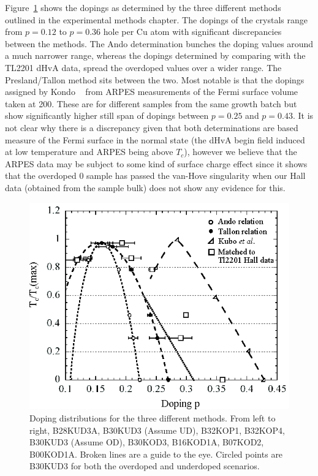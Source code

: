 Figure~\ref{Fig:ResH:Dopings} shows the dopings as determined by the three different methods outlined in the experimental methods chapter. The dopings of the crystals range from $p=0.12$ to $p=0.36$ hole per Cu atom with significant discrepancies between the methods. The Ando determination bunches the doping values around a much narrower range, whereas the dopings determined by comparing with the \ac{TL2201} \ac{dHvA} data, spread the overdoped values over a wider range. The Presland/Tallon method sits between the two. Most notable is that the dopings assigned by Kondo \etal~\cite{Kondo2004} from \ac{ARPES} measurements of the Fermi surface volume taken at \unit{200}{\kelvin}. These are for different samples from the same growth batch but show significantly higher still span of dopings between $p=0.25$ and $p=0.43$. It is not clear why there is a discrepancy given that both determinations are based measure of the Fermi surface in the normal state (the \ac{dHvA} begin field induced at low temperature and \ac{ARPES} being above $T_c$), however we believe that the \ac{ARPES} data may be subject to some kind of surface charge effect since it shows that the overdoped \unit{0}{\kelvin} sample has passed the van-Hove singularity when our Hall data (obtained from the sample bulk) does not show any evidence for this.

\begin{figure}[htbp]
    \begin{center}
        \includegraphics[scale=1.1]{Chapter-HallBSCO/Figures/Dopings/Dopings}
        \caption{Doping distributions for the three different methods. From left to right, B28KUD3A, B30KUD3 (Assume UD), B32KOP1, B32KOP4, B30KUD3 (Assume OD), B30KOD3, B16KOD1A, B07KOD2, B00KOD1A. Broken lines are a guide to the eye. Circled points are B30KUD3 for both the overdoped and underdoped scenarios.}
        \label{Fig:ResH:Dopings}
    \end{center}
\end{figure}

